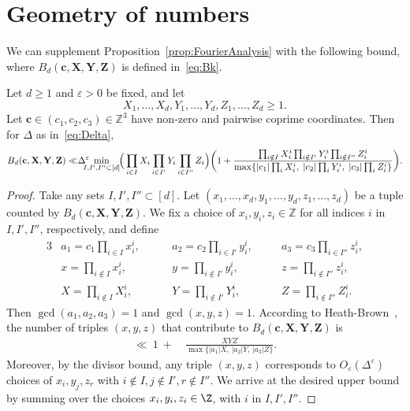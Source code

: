 \section{Geometry of numbers}\label{s:geom}


We can supplement Proposition~\ref{prop:FourierAnalysis} with the following bound,
where $B_d(\mathbf{c},\mathbf{X},\mathbf{Y},\mathbf{Z})$ is defined in~\eqref{eq:Bk}.

\begin{proposition}\label{prop:GeometryofNumbers}
  Let $d\geq 1$ and $\varepsilon>0$ be fixed, and let
  \[
  X_1,\ldots, X_d, Y_1,\ldots, Y_d,Z_1,\ldots, Z_d\geq 1.
  \]
  Let $\mathbf{c}\in (c_1,c_2,c_3)\in \mathbb{Z}^3$ have non-zero and pairwise coprime coordinates.
  Then for $\Delta$ as in~\eqref{eq:Delta},
  \[
  B_d(\mathbf{c},\mathbf{X},\mathbf{Y},\mathbf{Z})
  \ll
  \hspace{-0.1cm} \Delta^{\varepsilon}
  \hspace{-0.3cm}
  \min_{I,I',I''\subset[d]}
  \hspace{-0.1cm}
  \Big(\prod_{i\in I}X_i\prod_{i\in I'}Y_i\prod_{i\in I''}Z_i\Big)\bigg(1 +
  \frac{\prod_{i\notin I}X_i^i\prod_{i\notin I'}Y_i^i\prod_{i\notin I''}Z_i^i}
  {\max\{|c_1|\prod_{i}X_i^i,\;|c_2|\prod_{i}Y_i^i,\;|c_3|\prod_{i}Z_i^i\}}\bigg).
  \]
\end{proposition}
\begin{proof}
  Take any sets $I,I',I''\subset[d]$. Let $(x_1,\ldots, x_d,y_1,\ldots, y_d,z_1,\ldots, z_d)$ be a tuple counted by $B_d(\mathbf{c},\mathbf{X},\mathbf{Y},\mathbf{Z})$. We fix a choice of
  $
  x_i,y_i,z_i \in \mathbb{Z}
  $ for all indices $i$ in $I,I',I''$, respectively, and define
  \begin{alignat*}{3}
  &a_1=c_1\prod_{i\in I}x_i^i, \quad
  &&a_2=c_2\prod_{i\in I'}y_i^i, \quad
  &&a_3=c_3\prod_{i\in I''}z_i^i,\\
  &x=\prod_{i\notin I}x_i^i, \qquad
  &&y=\prod_{i\notin I'}y_i^i, \qquad
  &&z=\prod_{i\notin I''}z_i^i,\\
  &X=\prod_{i\notin I}X_i^i, \qquad
  &&Y=\prod_{i\notin I'}Y_i^i, \qquad
  &&Z=\prod_{i\notin I''}Z_i^i.
  \end{alignat*}
  Then $\gcd(a_1,a_2,a_3)=1$ and $\gcd(x,y,z)=1$. According to Heath-Brown~\cite[Lemma 3]{h-b84}, the number of triples $(x,y,z)$ that contribute to $B_d(\mathbf{c},\mathbf{X},\mathbf{Y},\mathbf{Z})$ is
  \begin{align*}
  \ll \ 1 \ + \ &
  \frac{XYZ}{\max\big\{|a_1|X,\,|a_2|Y,\,|a_3|Z\big\}}.
  \end{align*}
  Moreover, by the divisor bound, any triple $(x,y,z)$ corresponds to $O_{\varepsilon}(\Delta^{\varepsilon})$ choices of $x_i,y_j,z_r$ with $i\not \in I, j\not \in I', r\not \in I''$.
  We arrive at the
  desired upper bound by
  summing over the choices $x_i,y_i,z_i\in\Z$, with $i$ in $I,I',I''$.
\end{proof}

